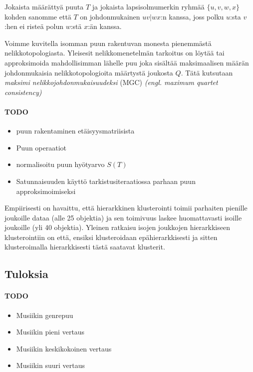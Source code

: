 \documentclass[12pt,finnish]{tktltiki2}
\theoremstyle{definition}
\theoremstyle{remark}
\newcommand{\engl}[1]{\emph{(engl. #1)}}
\begin{document}
    Jokaista määrättyä puuta $T$ ja jokaista lapsisolmumerkin ryhmää $\{u,v,w,x\}$ kohden sanomme että $T$ on johdonmukainen $uv|wx$:n kanssa, joss polku $u$:sta $v$:hen ei risteä polun $w$:stä $x$:än kanssa.

    Voimme kuvitella isomman puun rakentuvan monesta pienemmästä nelikkotopologiasta. Yleisesit nelikkomenetelmän tarkoitus on löytää tai approksimoida mahdollisimman lähelle puu joka sisältää maksimaalisen määrän johdonmukaisia nelikkotopologioita määrtystä joukosta $Q$. Tätä kutsutaan \emph{maksimi nelikkojohdonmukaisuudeksi} (MGC) \engl{maximum quartet consistency}


  \paragraph{TODO} %
    \begin{itemize}
      \item puun rakentaminen etäisyysmatriisista
      \item Puun operaatiot
      \item normalisoitu puun hyötyarvo $S(T)$
      \item Satunnaisuuden käyttö tarkistusiteraatiossa parhaan puun approksimoimiseksi
    \end{itemize}

    Empiirisesti on havaittu, että hierarkkinen klusterointi toimii parhaiten pienille joukoille dataa (alle 25 objektia) ja sen toimivuus laskee huomattavasti isoille joukoille (yli 40 objektia). Yleinen ratkaisu isojen joukkojen hierarkkiseen klusterointiin on että, ensiksi klusteroidaan epähierarkkisesti ja sitten klusteroimalla hierarkkisesti tästä saatavat klusterit.
    \subsection{Tuloksia} %
    \label{sub:tuloksia}
      \paragraph{TODO} %
      \begin{itemize}
        \item Musiikin genrepuu
        \item Musiikin pieni vertaus
        \item Musiikin keskikokoinen vertaus
        \item Musiikin suuri vertaus
      \end{itemize}
\end{document}
